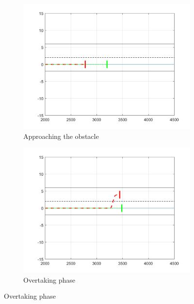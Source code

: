 \begin{figure}[H]
\centering

    \begin{subfigure}{.33\textwidth}
    \centering
   \includegraphics[width=1.1\textwidth,keepaspectratio]{Figures/overtake_single_dynamic_left.png}
    \caption{Approaching the obstacle}
    \label{subfig:single_left}
    \end{subfigure}%
    \begin{subfigure}{.33\textwidth}
    \centering
    \includegraphics[width=1.1\textwidth,keepaspectratio]{Figures/overtake_single_dynamic_center.png}
    \caption{Overtaking phase}
    \label{subfig:single_center}
    \end{subfigure}

\end{figure}
